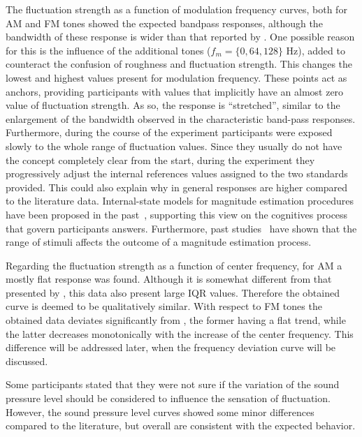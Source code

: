 \documentclass[../main.tex]{subfiles}
\begin{document}
The fluctuation strength as a function of modulation frequency curves, both for
\gls{AM} and \gls{FM} tones showed the expected bandpass responses, although
the bandwidth of these response is wider than that reported by
\citeauthor{Fastl2007Psychoacoustics}. One possible reason for this is the
influence of the additional tones ($f_m = \{0, 64, 128\}$ Hz), added to
counteract the confusion of roughness and fluctuation strength. This changes
the lowest and highest values present for modulation frequency. These points
act as anchors, providing participants with values that implicitly have an
almost zero value of fluctuation strength. As so, the response is ``stretched'',
similar to the enlargement of the bandwidth observed in the characteristic
band-pass responses. Furthermore, during the course of the experiment
participants were exposed slowly to the whole range of fluctuation values. Since
they usually do not have the concept completely clear from the start, during the
experiment they progressively adjust the internal references values assigned to
the two standards provided. This could also explain why in general responses are
higher compared to the literature data. Internal-state models for magnitude
estimation procedures have been proposed in the past~\cite{Marley1972},
supporting this view on the cognitives process that govern participants answers.
Furthermore, past studies~\cite{Teghtsoonian1978} have shown that the range of
stimuli affects the outcome of a magnitude estimation process.

Regarding the fluctuation strength as a function of center frequency, for
\gls{AM} a mostly flat response was found. Although it is somewhat different
from that presented by \citeauthor{Fastl2007Psychoacoustics}, this data also
present large \gls{IQR} values. Therefore the obtained curve is deemed to be
qualitatively similar. With respect to \gls{FM} tones the obtained data
deviates significantly from \citeauthor{Fastl2007Psychoacoustics}, the former
having a flat trend, while the latter decreases monotonically with the increase
of the center frequency. This difference will be addressed later, when the
frequency deviation curve will be discussed.

Some participants stated that they were not sure if the variation of the
sound pressure level should be considered to influence the sensation of
fluctuation. However, the sound pressure level curves showed some minor
differences compared to the literature, but overall are consistent with the
expected behavior.
\end{document}
